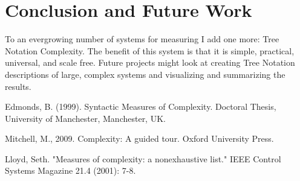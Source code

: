 \documentclass[journal]{IEEEtran}
\begin{document}
\section{Conclusion and Future Work}

To an evergrowing number of systems for measuring I add one more: Tree Notation Complexity. The benefit of this system is that it is simple, practical, universal, and scale free. Future projects might look at creating Tree Notation descriptions of large, complex systems and visualizing and summarizing the results.

\begin{thebibliography}{4}

Edmonds, B. (1999). Syntactic Measures of Complexity. Doctoral Thesis, University of Manchester, Manchester, UK.

Mitchell, M., 2009. Complexity: A guided tour. Oxford University Press.

Lloyd, Seth. "Measures of complexity: a nonexhaustive list." IEEE Control Systems Magazine 21.4 (2001): 7-8.

\end{thebibliography}
\end{document}

